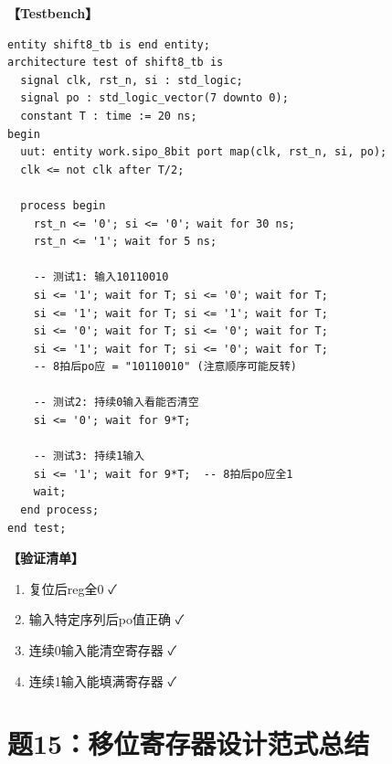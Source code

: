 \begin{solution}[完整解答]

\textbf{【Testbench】}
\begin{lstlisting}
entity shift8_tb is end entity;
architecture test of shift8_tb is
  signal clk, rst_n, si : std_logic;
  signal po : std_logic_vector(7 downto 0);
  constant T : time := 20 ns;
begin
  uut: entity work.sipo_8bit port map(clk, rst_n, si, po);
  clk <= not clk after T/2;

  process begin
    rst_n <= '0'; si <= '0'; wait for 30 ns;
    rst_n <= '1'; wait for 5 ns;

    -- 测试1: 输入10110010
    si <= '1'; wait for T; si <= '0'; wait for T;
    si <= '1'; wait for T; si <= '1'; wait for T;
    si <= '0'; wait for T; si <= '0'; wait for T;
    si <= '1'; wait for T; si <= '0'; wait for T;
    -- 8拍后po应 = "10110010" (注意顺序可能反转)

    -- 测试2: 持续0输入看能否清空
    si <= '0'; wait for 9*T;

    -- 测试3: 持续1输入
    si <= '1'; wait for 9*T;  -- 8拍后po应全1
    wait;
  end process;
end test;
\end{lstlisting}

\textbf{【验证清单】}
\begin{enumerate}
  \item 复位后reg全0 ✓
  \item 输入特定序列后po值正确 ✓
  \item 连续0输入能清空寄存器 ✓
  \item 连续1输入能填满寄存器 ✓
\end{enumerate}

\end{solution}


\section{题15：移位寄存器设计范式总结}

